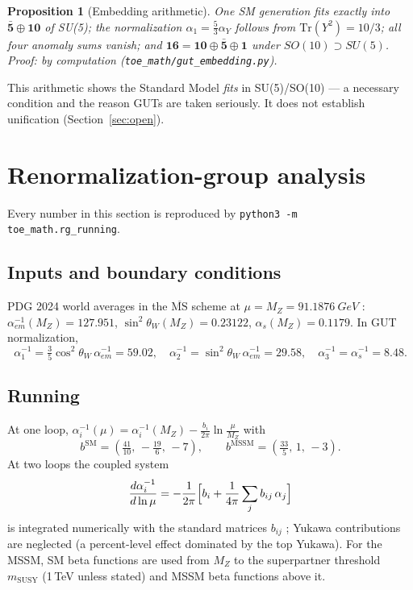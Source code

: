 \documentclass[11pt]{article}
\newtheorem{proposition}{Proposition}
\theoremstyle{remark}
\begin{document}
\begin{proposition}[Embedding arithmetic]
\label{prop:embedding}
One SM generation fits exactly into
$\bar{\mathbf{5}}\oplus\mathbf{10}$ of SU(5); the normalization
$\alpha_1 = \frac{5}{3}\alpha_Y$ follows from
$\mathrm{Tr}(Y^2) = 10/3$; all four anomaly sums vanish; and
$\mathbf{16} = \mathbf{10}\oplus\bar{\mathbf{5}}\oplus\mathbf{1}$ under
$SO(10)\supset SU(5)$.
\emph{Proof: by computation
(\texttt{toe\_math/gut\_embedding.py}).}\qedhere
\end{proposition}

This arithmetic shows the Standard Model \emph{fits} in SU(5)/SO(10) ---
a necessary condition and the reason GUTs are taken seriously. It does
not establish unification (Section~\ref{sec:open}).

\section{Renormalization-group analysis}
\label{sec:rg}

Every number in this section is reproduced by
\texttt{python3 -m toe\_math.rg\_running}.

\subsection{Inputs and boundary conditions}

PDG 2024 world averages in the $\overline{\mathrm{MS}}$ scheme at
$\mu = M_Z = \SI{91.1876}{GeV}$ \cite{pdg}:
$\alpha_{em}^{-1}(M_Z) = 127.951$, $\sin^2\theta_W(M_Z) = 0.23122$,
$\alpha_s(M_Z) = 0.1179$. In GUT normalization,
\begin{equation}
\alpha_1^{-1} = \tfrac{3}{5}\cos^2\theta_W\,\alpha_{em}^{-1} = 59.02,
\quad
\alpha_2^{-1} = \sin^2\theta_W\,\alpha_{em}^{-1} = 29.58,
\quad
\alpha_3^{-1} = \alpha_s^{-1} = 8.48.
\end{equation}

\subsection{Running}

At one loop, $\alpha_i^{-1}(\mu) = \alpha_i^{-1}(M_Z) -
\frac{b_i}{2\pi}\ln\frac{\mu}{M_Z}$ with
\begin{equation}
b^{\mathrm{SM}} = \left(\tfrac{41}{10},\, -\tfrac{19}{6},\, -7\right),
\qquad
b^{\mathrm{MSSM}} = \left(\tfrac{33}{5},\, 1,\, -3\right).
\end{equation}
At two loops the coupled system
\begin{equation}
\frac{d\alpha_i^{-1}}{d\ln\mu} = -\frac{1}{2\pi}\Bigl[b_i
+ \frac{1}{4\pi}\sum_j b_{ij}\,\alpha_j\Bigr]
\end{equation}
is integrated numerically with the standard matrices $b_{ij}$
\cite{machacek-vaughn,martin-ramond}; Yukawa contributions are
neglected (a percent-level effect dominated by the top Yukawa). For the
MSSM, SM beta functions are used from $M_Z$ to the superpartner
threshold $m_{\mathrm{SUSY}}$ (1\,TeV unless stated) and MSSM beta
functions above it.
\end{document}

